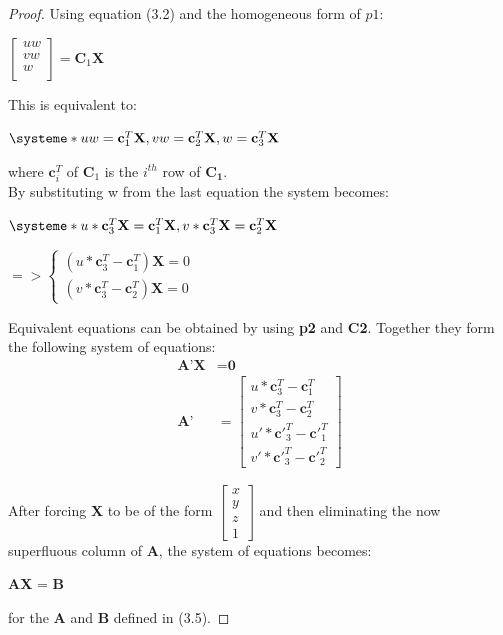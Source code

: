 \documentclass[12pt,a4paper,twoside,openright]{report}
\begin{document}
\begin{proof}
Using equation (3.2) and the homogeneous form of $p1$: \\
\begin{center}
$\begin{bmatrix}
	uw \\
	vw \\
	w \\
  \end{bmatrix} = \textbf{C}_{1}\textbf{X}$
\end{center}
This is equivalent to:
\begin{center}
$\systeme*{
uw = \textbf{c}_{1}^T \textbf{X},
vw = \textbf{c}_{2}^T \textbf{X},
w = \textbf{c}_{3}^T  \textbf{X}}$
\end{center}
where  $\mathbf{c}_{i}^T$ of $\mathbf{C}_{1}$ is the $i^{th}$ row of $\mathbf{C_{1}}$. \\

By substituting w from the last equation the system becomes:
\begin{center}
$\systeme*{
u * \textbf{c}_{3}^T \textbf{X} = \textbf{c}_{1}^T \textbf{X},
v * \textbf{c}_{3}^T \textbf{X} = \textbf{c}_{2}^T \textbf{X}}$ \\
\end{center}
\begin{center}
$ => \begin{cases}
(u * \mathbf{c}_{3}^T - \mathbf{c}_{1}^T) \mathbf{X} = 0  \\
(v * \textbf{c}_{3}^T - \mathbf{c}_{2}^T) \mathbf{X} = 0
\end{cases}$
\end{center}

Equivalent equations can be obtained by using \textbf{p2} and \textbf{C2}. Together they form the following system of equations:
\begin{align}
	\textbf{A'}\textbf{X} &= \textbf{0}\\ 
\textbf{A'} &= \begin{bmatrix}
u * \mathbf{c}_{3}^T - \mathbf{c}_{1}^T\\
v * \mathbf{c}_{3}^T - \mathbf{c}_{2}^T\\
u' * \mathbf{c'}_{3}^T - \mathbf{c'}_{1}^T\\
v' * \mathbf{c'}_{3}^T - \mathbf{c'}_{2}^T
\end{bmatrix}
\end{align}

After forcing \textbf{X} to be of the form 
$\begin{bmatrix}
x \\
y \\
z \\
1
\end{bmatrix}$ and then eliminating the now superfluous column of \textbf{A}, the system of equations becomes:
\begin{center}
	\textbf{A}\textbf{X} = \textbf{B}
\end{center} for the \textbf{A} and \textbf{B} defined in (3.5).
\end{proof}
\end{document}
